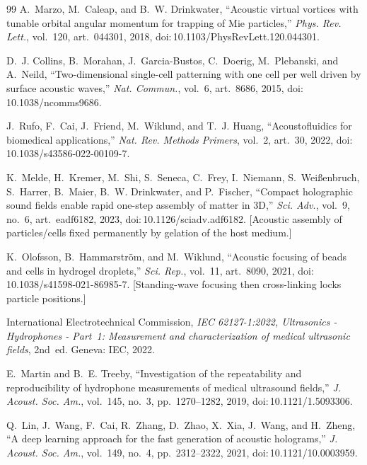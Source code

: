 \documentclass[11pt]{article}
\theoremstyle{definition}
\begin{document}
\begin{thebibliography}{99}
A.~Marzo, M.~Caleap, and B.~W. Drinkwater, ``Acoustic virtual vortices with tunable orbital
angular momentum for trapping of Mie particles,'' \emph{Phys. Rev. Lett.}, vol.~120,
art.~044301, 2018, doi:\,10.1103/PhysRevLett.120.044301.

D.~J. Collins, B.~Morahan, J.~Garcia-Bustos, C.~Doerig, M.~Plebanski, and A.~Neild,
``Two-dimensional single-cell patterning with one cell per well driven by surface acoustic
waves,'' \emph{Nat. Commun.}, vol.~6, art.~8686, 2015, doi:\,10.1038/ncomms9686.

J.~Rufo, F.~Cai, J.~Friend, M.~Wiklund, and T.~J. Huang, ``Acoustofluidics for biomedical
applications,'' \emph{Nat. Rev. Methods Primers}, vol.~2, art.~30, 2022,
doi:\,10.1038/s43586-022-00109-7.

K.~Melde, H.~Kremer, M.~Shi, S.~Seneca, C.~Frey, I.~Niemann, S.~Wei{\ss}enbruch, S.~Harrer,
B.~Maier, B.~W. Drinkwater, and P.~Fischer, ``Compact holographic sound fields enable rapid
one-step assembly of matter in 3D,'' \emph{Sci. Adv.}, vol.~9, no.~6, art.~eadf6182, 2023,
doi:\,10.1126/sciadv.adf6182. [Acoustic assembly of particles/cells fixed permanently by
gelation of the host medium.]

K.~Olofsson, B.~Hammarstr\"om, and M.~Wiklund, ``Acoustic focusing of beads and cells in
hydrogel droplets,'' \emph{Sci. Rep.}, vol.~11, art.~8090, 2021,
doi:\,10.1038/s41598-021-86985-7. [Standing-wave focusing then cross-linking locks particle
positions.]

International Electrotechnical Commission, \emph{IEC 62127-1:2022, Ultrasonics - 
Hydrophones - Part~1: Measurement and characterization of medical ultrasonic fields},
2nd~ed. Geneva: IEC, 2022.

E.~Martin and B.~E. Treeby, ``Investigation of the repeatability and reproducibility of
hydrophone measurements of medical ultrasound fields,'' \emph{J. Acoust. Soc. Am.},
vol.~145, no.~3, pp.~1270--1282, 2019, doi:\,10.1121/1.5093306.

Q.~Lin, J.~Wang, F.~Cai, R.~Zhang, D.~Zhao, X.~Xia, J.~Wang, and H.~Zheng, ``A deep learning
approach for the fast generation of acoustic holograms,'' \emph{J. Acoust. Soc. Am.},
vol.~149, no.~4, pp.~2312--2322, 2021, doi:\,10.1121/10.0003959.


\end{thebibliography}
\end{document}
